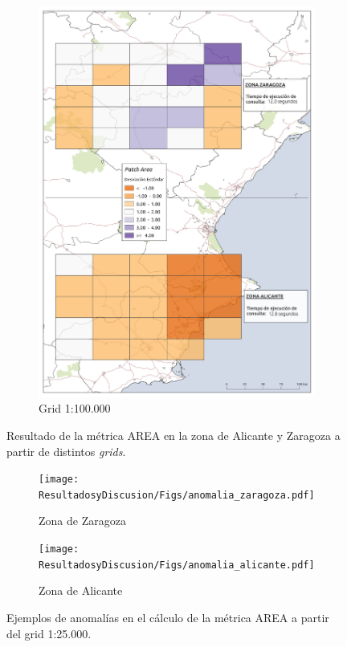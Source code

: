 \begin{figure}
\begin{subfigure}[b]{0.4\textwidth}
    \includegraphics[width=\textwidth]{ResultadosyDiscusion/Figs/Results/p_100.pdf}
    \caption{Grid 1:100.000}
    \label{fig:p_100}
  \end{subfigure}
  
  \caption{Resultado de la métrica AREA en la zona de Alicante y Zaragoza a partir de distintos \textit{grids}.}
  \label{fig:p_area}
  \end{figure}






\begin{figure}
  \centering
  \begin{subfigure}[b]{0.7\textwidth}
    \texttt{[image: ResultadosyDiscusion/Figs/anomalia\_zaragoza.pdf]}
    \caption{Zona de Zaragoza}
    \label{fig:p_25}   
  \end{subfigure}             
  \begin{subfigure}[b]{0.7\textwidth}
    \texttt{[image: ResultadosyDiscusion/Figs/anomalia\_alicante.pdf]}
    \caption{Zona de Alicante}
    \label{fig:p_50}
  \end{subfigure}             
  
  \caption{Ejemplos de anomalías en el cálculo de la métrica AREA a partir del grid 1:25.000.}
  \label{fig:anomalia}
  \end{figure}







